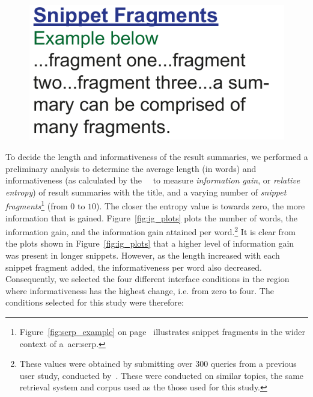 \begin{figure}
    \begin{center}
    \vspace*{-10mm}
    \includegraphics[width=1\textwidth]{figures/ch7-fragments.pdf}
    \end{center}
    \vspace*{-4mm}
    \label{fig:fragments}
\end{figure}

To decide the length and informativeness of the result summaries, we performed a preliminary analysis to determine the average length (in words) and informativeness (as calculated by the~~\citep{kullback1951information}  to measure \emph{information gain}, or \emph{relative entropy}) of result summaries with the title, and a varying number of \emph{snippet fragments}\footnote{Figure~\ref{fig:serp_example} on page~\pageref{fig:serp_example} illustrates snippet fragments in the wider context of a~\gls{acr:serp}.} (from $0$ to $10$). The closer the entropy value is towards zero, the more information that is gained. Figure~\ref{fig:ig_plots} plots the number of words, the information gain, and the information gain attained per word.\footnote{These values were obtained by submitting over $300$ queries from a previous user study, conducted by~\cite{azzopardi2013query_cost}. These were conducted on similar topics, the same retrieval system and corpus used as the those used for this study.} It is clear from the plots shown in Figure~\ref{fig:ig_plots} that a higher level of information gain was present in longer snippets. However, as the length increased with each snippet fragment added, the informativeness per word also decreased. Consequently, we selected the four different interface conditions in the region where informativeness has the highest change, i.e. from zero to four. The conditions selected for this study were therefore:

